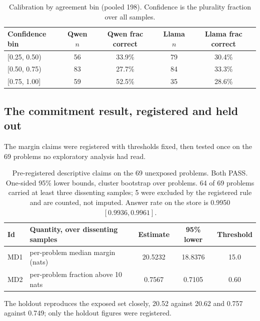 \documentclass{article}
\begin{document}
\begin{table}[t]
\begin{center}
\begin{tabular}{lcccc}
\toprule
\textbf{Confidence bin} & \textbf{Qwen $n$} & \textbf{Qwen frac correct} & \textbf{Llama $n$} & \textbf{Llama frac correct} \\
\midrule
{[}0.25, 0.50) & 56 & 33.9\% & 79 & 30.4\% \\
{[}0.50, 0.75) & 83 & 27.7\% & 84 & 33.3\% \\
{[}0.75, 1.00] & 59 & 52.5\% & 35 & 28.6\% \\
\bottomrule
\end{tabular}
\end{center}
\caption{Calibration by agreement bin (pooled 198). Confidence is the
plurality fraction over all samples.}
\label{tab:calibration}
\end{table}

\subsection{The commitment result, registered and held out}
\label{sec:commitment}

The margin claims were registered with thresholds fixed, then tested once on
the 69 problems no exploratory analysis had read.

\begin{table}[t]
\begin{center}
\begin{tabular}{llccc}
\toprule
\textbf{Id} & \textbf{Quantity, over dissenting samples} & \textbf{Estimate} & \textbf{95\% lower} & \textbf{Threshold} \\
\midrule
MD1 & per-problem median margin (nats) & 20.5232 & 18.8376 & 15.0 \\
MD2 & per-problem fraction above 10 nats & 0.7567 & 0.7105 & 0.60 \\
\bottomrule
\end{tabular}
\end{center}
\caption{Pre-registered descriptive claims on the 69 unexposed problems. Both
PASS. One-sided 95\% lower bounds, cluster bootstrap over problems. 64 of 69
problems carried at least three dissenting samples; 5 were excluded by the
registered rule and are counted, not imputed. Answer rate on the store is
0.9950 $[0.9936, 0.9961]$.}
\label{tab:md}
\end{table}

The holdout reproduces the exposed set closely, 20.52 against 20.62 and 0.757
against 0.749; only the holdout figures were registered.
\end{document}
